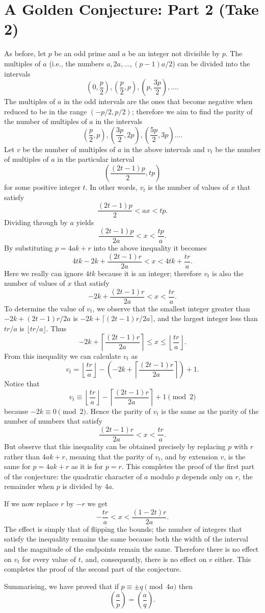 \documentclass[a4paper]{article}
\newcommand{\leg}[2]{\left(\frac{#1}{#2}\right)}
\newcommand{\floor}[1]{\lfloor#1\rfloor}
\newcommand{\bfloor}[1]{\left\lfloor#1\right\rfloor}
\newcommand{\ceil}[1]{\lceil#1\rceil}
\newcommand{\bceil}[1]{\left\lceil#1\right\rceil}
\newcommand{\marginnote}[1]{\marginpar{\footnotesize{#1}}}
\begin{document}
\section*{A Golden Conjecture: Part 2 (Take 2)}
As before, let \(p\) be an odd prime and \(a\)
\marginnote{I very much hope this proof is correct.}
be an integer not divisible by \(p\).
The multiples of \(a\) (i.e., the numbers \(a,2a,\ldots,(p-1)a/2\)) can be divided into
the intervals
\[\left(0,\frac{p}{2}\right),\left(\frac{p}{2},p\right),\left(p,\frac{3p}{2}\right),\ldots.\]
The multiples of \(a\) in the odd intervals are the ones
that become negative when reduced to be in the
range \((-p/2,p/2)\); therefore we aim to find the parity
of the number of multiples of \(a\) in the intervals
\[\left(\frac{p}{2},p\right),\left(\frac{3p}{2},2p\right),\left(\frac{5p}{2},3p\right)\ldots.\]
Let \(v\) be the number of multiples of \(a\) in the above
intervals and \(v_t\) be the number of multiples of \(a\)
in the particular interval 
\[
	\left(\frac{(2t-1)p}{2},tp\right)
\]
for some positive integer \(t\).
In other words, \(v_t\) is the number of values of \(x\)
that satisfy
\[\frac{(2t-1)p}{2}<ax<tp.\]
Dividing through by \(a\) yields
\[\frac{(2t-1)p}{2a}<x<\frac{tp}{a}.\]
By substituting \(p=4ak+r\) into the above inequality
it becomes
\[4tk-2k+\frac{(2t-1)r}{2a}<x<4tk+\frac{tr}{a}.\]
Here we really can ignore \(4tk\) because it is an integer;
therefore \(v_t\) is also the number of values of \(x\)
that satisfy
\[-2k+\frac{(2t-1)r}{2a}<x<\frac{tr}{a}.\]
To determine the value of \(v_t\), we observe that the
smallest integer greater than \(-2k+(2t-1)r/2a\) is \(-2k+\ceil{(2t-1)r/2a}\),
and the largest integer less than \(tr/a\) is \(\floor{tr/a}.\)
Thus 
\[-2k+\bceil{\frac{(2t-1)r}{2a}}\le x\le\bfloor{\frac{tr}{a}}.\]
From this inequality we can calculate \(v_t\) as
\[v_t=\bfloor{\frac{tr}{a}}-\left(-2k+\bceil{\frac{(2t-1)r}{2a}}\right)+1.\]
Notice that \[v_t\equiv\bfloor{\frac{tr}{a}}-\bceil{\frac{(2t-1)r}{2a}}+1\pmod{2}\] because \(-2k\equiv0\pmod{2}.\)
Hence the parity of \(v_t\) is the same as the parity of the number
of numbers that satisfy
\[\frac{(2t-1)r}{2a}<x<\frac{tr}{a}.\]
But observe that this inequality can be obtained precisely
by replacing \(p\) with \(r\) rather than \(4ak+r\), meaning
that the parity of \(v_t\), and by extension \(v\), is the
same for \(p=4ak+r\) as it is for \(p=r\).
This completes the proof of the first part of the conjecture: 
the quadratic character of \(a\) modulo \(p\) depends only
on \(r\), the remainder when \(p\) is divided by \(4a\).

If we now replace \(r\) by \(-r\) we get
\[-\frac{tr}{a}<x<\frac{(1-2t)r}{2a}.\]
The effect is simply that of 
flipping the bounds; the number
of integers that satisfy the inequality remains
the same because both the width of the interval and
the magnitude of the endpoints
remain the same. Therefore
there is no effect on \(v_t\) for every value of \(t\),
and, consequently, there is no effect on \(v\) either.
This completes the proof of the second part of the conjecture.

Summarising, we have proved that if \(p\equiv\pm q\pmod{4a}\) 
then \[\leg{a}{p}=\leg{a}{q}.\]
\end{document}

